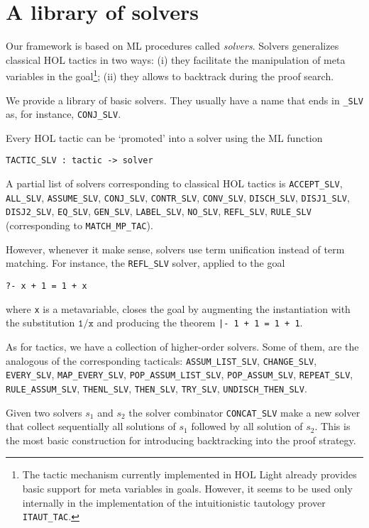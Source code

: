 \section{A library of solvers}
\label{sec:library-solvers}

Our framework is based on ML procedures called \emph{solvers}.
Solvers generalizes classical HOL tactics in two ways: (i) they
facilitate the manipulation of meta variables in the goal\footnote{The
  tactic mechanism currently implemented in HOL Light already provides
  basic support for meta variables in goals.  However, it seems to be
  used only internally in the implementation of the intuitionistic
  tautology prover \texttt{ITAUT\_TAC}.}; (ii) they allows to backtrack
during the proof search.

We provide a library of basic solvers.  They usually have a name that
ends in \verb|_SLV| as, for instance, \verb|CONJ_SLV|.

Every HOL tactic can be `promoted' into a solver using the ML function
\begin{verbatim}
TACTIC_SLV : tactic -> solver
\end{verbatim}
A partial list of solvers corresponding to classical HOL tactics is
\verb|ACCEPT_SLV|, \verb|ALL_SLV|, \verb|ASSUME_SLV|, \verb|CONJ_SLV|,
\verb|CONTR_SLV|, \verb|CONV_SLV|, \verb|DISCH_SLV|, \verb|DISJ1_SLV|,
\verb|DISJ2_SLV|, \verb|EQ_SLV|, \verb|GEN_SLV|, \verb|LABEL_SLV|,
\verb|NO_SLV|, \verb|REFL_SLV|, \verb|RULE_SLV| (corresponding to
\verb|MATCH_MP_TAC|).

However, whenever it make sense, solvers use term unification instead
of term matching.  For instance, the \verb|REFL_SLV| solver, applied
to the goal
\begin{verbatim}
?- x + 1 = 1 + x
\end{verbatim}
where \verb|x| is a metavariable, closes the goal by augmenting the
instantiation with the substitution $\mathtt{1}/\mathtt{x}$ and
producing the theorem \verb!|- 1 + 1 = 1 + 1!.

As for tactics, we have a collection of higher-order solvers.  Some of
them, are the analogous of the corresponding tacticals:
\verb|ASSUM_LIST_SLV|,
\verb|CHANGE_SLV|,
\verb|EVERY_SLV|,
\verb|MAP_EVERY_SLV|,
\verb|POP_ASSUM_LIST_SLV|,
\verb|POP_ASSUM_SLV|,
\verb|REPEAT_SLV|,
\verb|RULE_ASSUM_SLV|,
\verb|THENL_SLV|,
\verb|THEN_SLV|,
\verb|TRY_SLV|,
\verb|UNDISCH_THEN_SLV|.


Given two solvers $s_1$ and $s_2$ the solver combinator
\verb|CONCAT_SLV| make a new solver that collect sequentially all
solutions of $s_1$ followed by all solution of $s_2$.  This is the
most basic construction for introducing backtracking into the proof
strategy.

